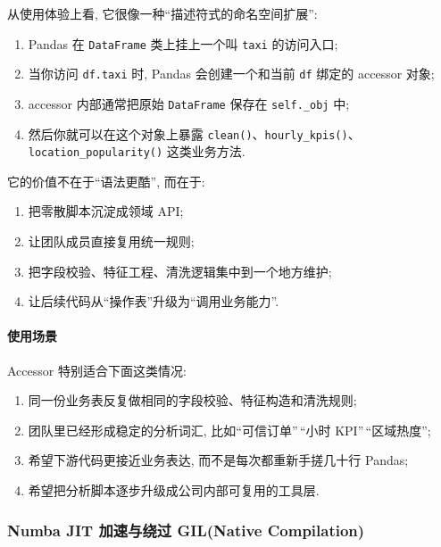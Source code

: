 \documentclass[11pt]{article}
\providecommand{\tightlist}{%
      \setlength{\itemsep}{0pt}\setlength{\parskip}{0pt}}
\begin{document}
从使用体验上看, 它很像一种``描述符式的命名空间扩展'':

\begin{enumerate}
\def\labelenumi{\arabic{enumi}.}
\tightlist
\item
  Pandas 在 \texttt{DataFrame} 类上挂上一个叫 \texttt{taxi} 的访问入口;
\item
  当你访问 \texttt{df.taxi} 时, Pandas 会创建一个和当前 \texttt{df}
  绑定的 accessor 对象;
\item
  accessor 内部通常把原始 \texttt{DataFrame} 保存在 \texttt{self.\_obj}
  中;
\item
  然后你就可以在这个对象上暴露
  \texttt{clean()}、\texttt{hourly\_kpis()}、\texttt{location\_popularity()}
  这类业务方法.
\end{enumerate}

它的价值不在于``语法更酷'', 而在于:

\begin{enumerate}
\def\labelenumi{\arabic{enumi}.}
\tightlist
\item
  把零散脚本沉淀成领域 API;
\item
  让团队成员直接复用统一规则;
\item
  把字段校验、特征工程、清洗逻辑集中到一个地方维护;
\item
  让后续代码从``操作表''升级为``调用业务能力''.
\end{enumerate}

    \paragraph{使用场景}\label{ux4f7fux7528ux573aux666f}

    Accessor 特别适合下面这类情况:

\begin{enumerate}
\def\labelenumi{\arabic{enumi}.}
\tightlist
\item
  同一份业务表反复做相同的字段校验、特征构造和清洗规则;
\item
  团队里已经形成稳定的分析词汇, 比如``可信订单''\,``小时
  KPI''\,``区域热度'';
\item
  希望下游代码更接近业务表达, 而不是每次都重新手搓几十行 Pandas;
\item
  希望把分析脚本逐步升级成公司内部可复用的工具层.
\end{enumerate}

    \subsubsection{Numba JIT 加速与绕过 GIL(Native
Compilation)}\label{numba-jit-ux52a0ux901fux4e0eux7ed5ux8fc7-gilnative-compilation}
\end{document}

